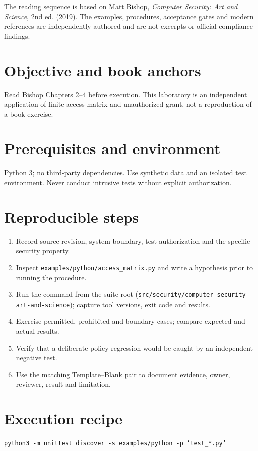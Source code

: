 \documentclass[10pt,letterpaper]{article}
\begin{document}
\makedoctocpage
\begin{notebox}
The reading sequence is based on Matt Bishop, \emph{Computer Security: Art and Science}, 2nd ed. (2019). The examples, procedures, acceptance gates and modern references are independently authored and are not excerpts or official compliance findings.
\end{notebox}
\section{Objective and book anchors}
Read Bishop Chapters 2--4 before execution. This laboratory is an independent application of finite access matrix and unauthorized grant, not a reproduction of a book exercise.
\section{Prerequisites and environment}
Python 3; no third-party dependencies. Use synthetic data and an isolated test environment. Never conduct intrusive tests without explicit authorization.
\section{Reproducible steps}
\begin{enumerate}
\item Record source revision, system boundary, test authorization and the specific security property.
\item Inspect \texttt{examples/python/access\_matrix.py} and write a hypothesis prior to running the procedure.
\item Run the command from the suite root (\texttt{src/security/computer-security-art-and-science}); capture tool versions, exit code and results.
\item Exercise permitted, prohibited and boundary cases; compare expected and actual results.
\item Verify that a deliberate policy regression would be caught by an independent negative test.
\item Use the matching Template--Blank pair to document evidence, owner, reviewer, result and limitation.
\end{enumerate}
\section{Execution recipe}
\begin{viewbox}\raggedright\small\texttt{python3 -m unittest discover -s examples/python -p 'test\_*.py'}\end{viewbox}
\end{document}
